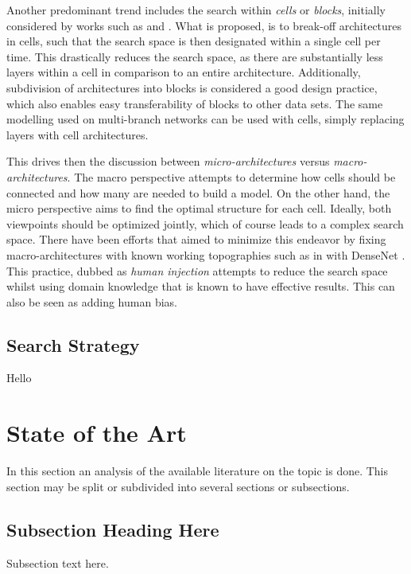 \documentclass[10pt,        %
               a4paper,     %
               journal,     %
               ]{IEEEtran}
\begin{document}
Another predominant trend includes the search within \textit{cells} or \textit{blocks}, initially considered by works such as
\cite{zhong2018practical} and \cite{zoph2018learning}. What is proposed, is to break-off architectures in cells, such that
the search space is then designated within a single cell per time. This drastically reduces the search space, as there are
substantially less layers within a cell in comparison to an entire architecture. Additionally, subdivision of architectures
into blocks is considered a good design practice, which also enables easy transferability of blocks to other data sets. The same
modelling used on multi-branch networks can be used with cells, simply replacing layers with cell architectures.

This drives then the discussion between \textit{micro-architectures} versus \textit{macro-architectures}. The macro perspective
attempts to determine how cells should be connected and how many are needed to build a model. On the other hand, the micro
perspective aims to find the optimal structure for each cell. Ideally, both viewpoints should be optimized jointly, which of course
leads to a complex search space. There have been efforts that aimed to minimize this endeavor by fixing macro-architectures with
known working topographies such as in \cite{pmlr-v80-cai18a} with DenseNet \cite{Huang_2017_CVPR}. This practice, dubbed as
\textit{human injection} attempts to reduce the search space whilst using domain knowledge that is known to have effective
results. This can also be seen as adding human bias.

\subsection{Search Strategy}
Hello

\section{State of the Art}
In this section an analysis of the available literature on the topic is done.
This section may be split or subdivided into several sections or subsections.

\subsection{Subsection Heading Here}
Subsection text here.

\end{document}
